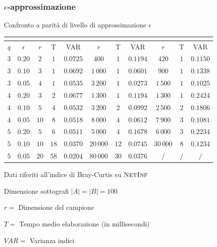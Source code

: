 \begin{frame}
	\frametitle{$\epsilon$-approssimazione}
	\centering
	
	Confronto a parità di livello di approssimazione $\epsilon$
	\begin{table}[ht]
		\begin{tabular}{|c|c|c|c|c|c|c|c|c|c|c|}
			\cline{3-11}
			\multicolumn{2}{c|}{} & \multicolumn{3}{c|}{\fcount} & \multicolumn{3}{c|}{\fsamp} & \multicolumn{3}{c|}{\base}\\
			\hline	
			$q$ & $\epsilon$ & $r$ & T    & VAR      & $r$ & T    & VAR      & $r$ & T   & VAR      \\ \hline
			$3$ & $0.20$     & \color{green}$2$  & $1$  & $0.0725$ & \color{orange}$400$     & $1$  & $0.1194$ & \color{   red}$420$     & $1$ & $0.1150$ \\ \hline
			$3$ & $0.10$     & \color{green}$3$  & $1$  & $0.0692$ & \color{   red}$1\,000$  & $1$  & $0.0601$ & \color{orange}$900$     & $1$ & $0.1338$ \\ \hline
			$3$ & $0.05$     & \color{green}$4$  & $1$  & $0.0535$ & \color{   red}$3\,200$  & $1$  & $0.0273$ & \color{orange}$1\,500$  & $1$ & $0.1025$ \\ \hline
			\hline
			$4$ & $0.20$     & \color{green}$3$  & $2$  & $0.0677$ & \color{   red}$1\,300$  & $1$  & $0.1194$ & \color{orange}$1\,300$  & $1$ & $0.2424$ \\ \hline
			$4$ & $0.10$     & \color{green}$5$  & $4$  & $0.0532$ & \color{   red}$3\,200$  & $2$  & $0.0992$ & \color{orange}$2\,500$  & $2$ & $0.1806$ \\ \hline
			$4$ & $0.05$     & \color{green}$10$ & $8$  & $0.0518$ & \color{   red}$8\,000$  & $4$  & $0.0612$ & \color{orange}$7\,900$  & $3$ & $0.1081$ \\ \hline
			\hline
			$5$ & $0.20$     & \color{green}$5$  & $6$  & $0.0511$ & \color{orange}$5\,000$  & $4$  & $0.1678$ & \color{   red}$6\,000$  & $3$ & $0.2234$ \\ \hline
			$5$ & $0.10$     & \color{green}$10$ & $18$ & $0.0370$ & \color{orange}$20\,000$ & $12$ & $0.0745$ & \color{   red}$30\,000$ & $8$ & $0.1234$ \\ \hline
			$5$ & $0.05$     & \color{green}$20$ & $58$ & $0.0204$ & \color{orange}$80\,000$ & $30$ & $0.0376$ & \color{   red}$/$       & $/$ & $/$      \\ \hline
		\end{tabular}
		
		\medskip
			Dati riferiti all'indice di Bray-Curtis su $\textsc{NetInf}$
		\small
		\begin{flushleft}
		
		
			Dimensione sottografi $|A| = |B| = 100$
		
			$r =$ Dimensione del campione
		
			$T = $ Tempo medio elaborazione (in millisecondi)
		
			$VAR = $ Varianza indici
		
		
		\end{flushleft}

	\end{table}
\end{frame}

